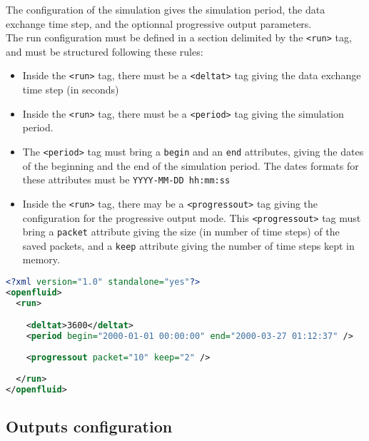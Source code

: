 The configuration of the simulation gives the simulation period, the data
exchange time step, and the optionnal progressive output parameters.\\
\noindent The run configuration must be defined in a section delimited by the
\texttt{<run>} tag, and must be structured following these rules:
\begin{itemize}
  \item Inside the \texttt{<run>} tag, there must be a \texttt{<deltat>} tag
  giving the data exchange time step (in seconds)
  \item Inside the \texttt{<run>} tag, there must be a \texttt{<period>} tag
  giving the simulation period.
  \item The \texttt{<period>} tag must bring a \texttt{begin} and an
  \texttt{end} attributes, giving the dates of the beginning and the end of the
  simulation period. The dates formats for these attributes must be
  \texttt{YYYY-MM-DD hh:mm:ss}
  \item Inside the \texttt{<run>} tag, there may be a \texttt{<progressout>}
  tag giving the configuration for the progressive output mode. This
  \texttt{<progressout>} tag must bring a \texttt{packet} attribute giving the
  size (in number of time steps) of the saved packets, and a \texttt{keep}
  attribute giving the number of time steps kept in memory.
\end{itemize}

\begin{lstlisting}[language=xml,title=\footnotesize\textit{example}]
<?xml version="1.0" standalone="yes"?>
<openfluid>
  <run>

    <deltat>3600</deltat>
    <period begin="2000-01-01 00:00:00" end="2000-03-27 01:12:37" />
    
    <progressout packet="10" keep="2" />
    
  </run>
</openfluid>
\end{lstlisting}

\bigskip

\subsection{Outputs configuration}

